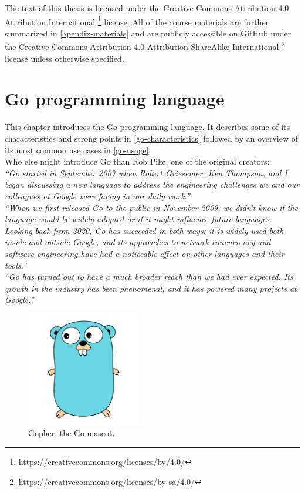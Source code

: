 \documentclass[
  digital,
  color,
  oneside,
  nosansbold,
  nocolorbold,
  nolof,
  nolot,
]{fithesis4}
\begin{document}
The text of this thesis is licensed under the Creative Commons Attribution 4.0 Attribution International \footnote{\url{https://creativecommons.org/licenses/by/4.0/}} license. All of the course materials are further summarized in \cref{apendix-materials} and are publicly accessible on GitHub\cite{github} under the Creative Commons Attribution 4.0 Attribution-ShareAlike International \footnote{\url{https://creativecommons.org/licenses/by-sa/4.0/}} license unless otherwise specified.

\chapter{Go programming language}\label{chapter-go}

This chapter introduces the Go programming language. It describes some of its characteristics and strong points in \cref{go-characteristics} followed by an overview of its most common use cases in \cref{go-usage}. \\

\noindent
Who else might introduce Go than Rob Pike, one of the original creators: \\

\noindent
\textit{\enquote{Go started in September 2007 when Robert Griesemer, Ken Thompson, and I began discussing a new language to address the engineering challenges we and our colleagues at Google were facing in our daily work.}} \\

\noindent
\textit{\enquote{When we first released Go to the public in November 2009, we didn’t know if the language would be widely adopted or if it might influence future languages. Looking back from 2020, Go has succeeded in both ways: it is widely used both inside and outside Google, and its approaches to network concurrency and software engineering have had a noticeable effect on other languages and their tools.}} \\

\noindent
\textit{\enquote{Go has turned out to have a much broader reach than we had ever expected. Its growth in the industry has been phenomenal, and it has powered many projects at Google.}} \cite{go-pike}

\begin{figure}[H]
    \centering
    \includegraphics[width=5cm]{figures/gopher.png}
    \caption{Gopher, the Go mascot.}
\end{figure}
\end{document}

